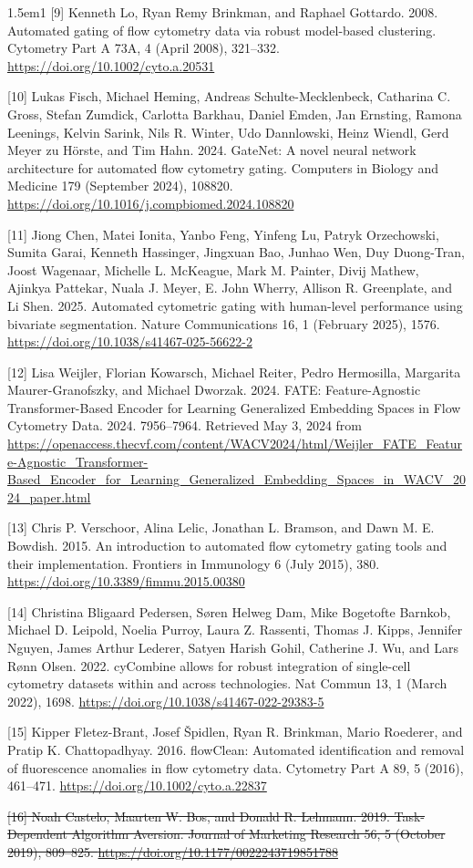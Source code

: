 \documentclass[ASNA]{latex/wiley/USG}
\begin{document}
\begin{hangparas}{1.5em}{1}
{[}9{]} Kenneth Lo, Ryan Remy Brinkman, and Raphael Gottardo. 2008.
Automated gating of flow cytometry data via robust model-based
clustering. Cytometry Part A 73A, 4 (April 2008), 321--332.
\url{https://doi.org/10.1002/cyto.a.20531}

{[}10{]} Lukas Fisch, Michael Heming, Andreas Schulte-Mecklenbeck,
Catharina C. Gross, Stefan Zumdick, Carlotta Barkhau, Daniel Emden, Jan
Ernsting, Ramona Leenings, Kelvin Sarink, Nils R. Winter, Udo
Dannlowski, Heinz Wiendl, Gerd Meyer zu Hörste, and Tim Hahn. 2024.
GateNet: A novel neural network architecture for automated flow
cytometry gating. Computers in Biology and Medicine 179 (September
2024), 108820. \url{https://doi.org/10.1016/j.compbiomed.2024.108820}

{[}11{]} Jiong Chen, Matei Ionita, Yanbo Feng, Yinfeng Lu, Patryk
Orzechowski, Sumita Garai, Kenneth Hassinger, Jingxuan Bao, Junhao Wen,
Duy Duong-Tran, Joost Wagenaar, Michelle L. McKeague, Mark M. Painter,
Divij Mathew, Ajinkya Pattekar, Nuala J. Meyer, E. John Wherry, Allison
R. Greenplate, and Li Shen. 2025. Automated cytometric gating with
human-level performance using bivariate segmentation. Nature
Communications 16, 1 (February 2025), 1576.
\url{https://doi.org/10.1038/s41467-025-56622-2}

{[}12{]} Lisa Weijler, Florian Kowarsch, Michael Reiter, Pedro
Hermosilla, Margarita Maurer-Granofszky, and Michael Dworzak. 2024.
FATE: Feature-Agnostic Transformer-Based Encoder for Learning
Generalized Embedding Spaces in Flow Cytometry Data. 2024. 7956--7964.
Retrieved May 3, 2024 from
\url{https://openaccess.thecvf.com/content/WACV2024/html/Weijler_FATE_Feature-Agnostic_Transformer-Based_Encoder_for_Learning_Generalized_Embedding_Spaces_in_WACV_2024_paper.html}

{[}13{]} Chris P. Verschoor, Alina Lelic, Jonathan L. Bramson, and Dawn
M. E. Bowdish. 2015. An introduction to automated flow cytometry gating
tools and their implementation. Frontiers in Immunology 6 (July 2015),
380. \url{https://doi.org/10.3389/fimmu.2015.00380}

{[}14{]} Christina Bligaard Pedersen, Søren Helweg Dam, Mike Bogetofte
Barnkob, Michael D. Leipold, Noelia Purroy, Laura Z. Rassenti, Thomas J.
Kipps, Jennifer Nguyen, James Arthur Lederer, Satyen Harish Gohil,
Catherine J. Wu, and Lars Rønn Olsen. 2022. cyCombine allows for robust
integration of single-cell cytometry datasets within and across
technologies. Nat Commun 13, 1 (March 2022), 1698.
\url{https://doi.org/10.1038/s41467-022-29383-5}

{[}15{]} Kipper Fletez-Brant, Josef Špidlen, Ryan R. Brinkman, Mario
Roederer, and Pratip K. Chattopadhyay. 2016. flowClean: Automated
identification and removal of fluorescence anomalies in flow cytometry
data. Cytometry Part A 89, 5 (2016), 461--471.
\url{https://doi.org/10.1002/cyto.a.22837}

{\color{revisionred}\sout{{[}16{]} Noah Castelo, Maarten W. Bos, and
Donald R. Lehmann. 2019. Task-Dependent Algorithm Aversion. Journal of
Marketing Research 56, 5 (October 2019), 809--825.
\url{https://doi.org/10.1177/0022243719851788}}}

\end{hangparas}
\end{document}
